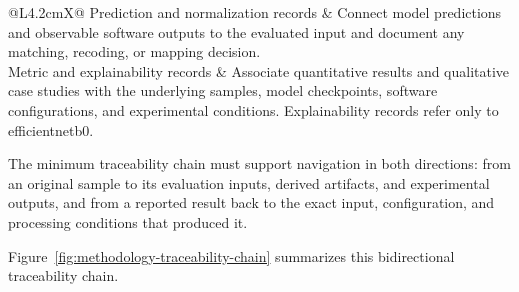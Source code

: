 \begin{table}[H]
\begin{tabularx}{\textwidth}{@{}L{4.2cm}X@{}}
Prediction and normalization records
&
Connect model predictions and observable software outputs to the evaluated
input and document any matching, recoding, or mapping decision. \\

Metric and explainability records
&
Associate quantitative results and qualitative case studies with the underlying
samples, model checkpoints, software configurations, and experimental
conditions. Explainability records refer only to \gls{efficientnetb0}. \\

\bottomrule
\end{tabularx}
\end{table}

The minimum traceability chain must support navigation in both directions: from
an original sample to its evaluation inputs, derived artifacts, and
experimental outputs, and from a reported result back to the exact input,
configuration, and processing conditions that produced it.

Figure~\ref{fig:methodology-traceability-chain} summarizes this bidirectional
traceability chain.

